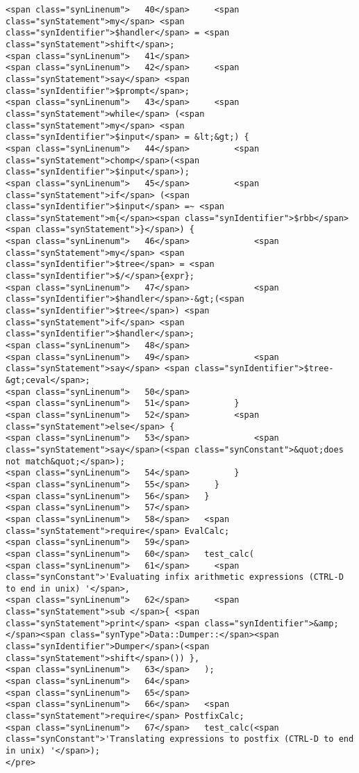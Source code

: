 \begin{verbatim}
<span class="synLinenum">   40</span>     <span class="synStatement">my</span> <span class="synIdentifier">$handler</span> = <span class="synStatement">shift</span>;
<span class="synLinenum">   41</span> 
<span class="synLinenum">   42</span>     <span class="synStatement">say</span> <span class="synIdentifier">$prompt</span>;
<span class="synLinenum">   43</span>     <span class="synStatement">while</span> (<span class="synStatement">my</span> <span class="synIdentifier">$input</span> = &lt;&gt;) {
<span class="synLinenum">   44</span>         <span class="synStatement">chomp</span>(<span class="synIdentifier">$input</span>);
<span class="synLinenum">   45</span>         <span class="synStatement">if</span> (<span class="synIdentifier">$input</span> =~ <span class="synStatement">m{</span><span class="synIdentifier">$rbb</span><span class="synStatement">}</span>) {
<span class="synLinenum">   46</span>             <span class="synStatement">my</span> <span class="synIdentifier">$tree</span> = <span class="synIdentifier">$/</span>{expr};
<span class="synLinenum">   47</span>             <span class="synIdentifier">$handler</span>-&gt;(<span class="synIdentifier">$tree</span>) <span class="synStatement">if</span> <span class="synIdentifier">$handler</span>;
<span class="synLinenum">   48</span> 
<span class="synLinenum">   49</span>             <span class="synStatement">say</span> <span class="synIdentifier">$tree-&gt;ceval</span>;
<span class="synLinenum">   50</span> 
<span class="synLinenum">   51</span>         }
<span class="synLinenum">   52</span>         <span class="synStatement">else</span> {
<span class="synLinenum">   53</span>             <span class="synStatement">say</span>(<span class="synConstant">&quot;does not match&quot;</span>);
<span class="synLinenum">   54</span>         }
<span class="synLinenum">   55</span>     }
<span class="synLinenum">   56</span>   }
<span class="synLinenum">   57</span> 
<span class="synLinenum">   58</span>   <span class="synStatement">require</span> EvalCalc;
<span class="synLinenum">   59</span> 
<span class="synLinenum">   60</span>   test_calc(
<span class="synLinenum">   61</span>     <span class="synConstant">'Evaluating infix arithmetic expressions (CTRL-D to end in unix) '</span>,
<span class="synLinenum">   62</span>     <span class="synStatement">sub </span>{ <span class="synStatement">print</span> <span class="synIdentifier">&amp;</span><span class="synType">Data::Dumper::</span><span class="synIdentifier">Dumper</span>(<span class="synStatement">shift</span>()) },
<span class="synLinenum">   63</span>   );
<span class="synLinenum">   64</span> 
<span class="synLinenum">   65</span> 
<span class="synLinenum">   66</span>   <span class="synStatement">require</span> PostfixCalc;
<span class="synLinenum">   67</span>   test_calc(<span class="synConstant">'Translating expressions to postfix (CTRL-D to end in unix) '</span>);
</pre>

\end{verbatim}

